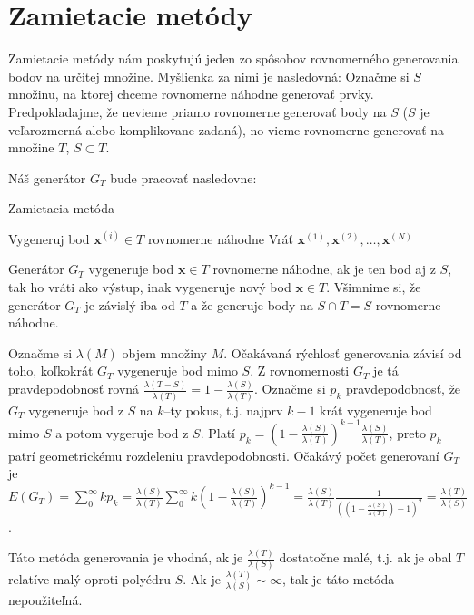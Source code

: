 \section{Zamietacie metódy}

Zamietacie metódy nám poskytujú jeden zo spôsobov rovnomerného generovania bodov na určitej množine.
Myšlienka za nimi je nasledovná: Označme si $S$ množinu, na ktorej chceme rovnomerne náhodne generovať prvky. Predpokladajme, že nevieme priamo rovnomerne generovať body na $S$ ($S$ je veľarozmerná alebo komplikovane zadaná), no vieme rovnomerne generovať na množine $T$, $S \subset T$.

Náš generátor $G_T$ bude pracovať nasledovne:

\begin{algorithm}[H]
	\caption{Zamietacia metóda}
	\label{zamietanie:basic}
	\begin{algorithmic}[1]
			\Repeat Vygeneruj bod $\mathbf x^{(i)} \in T$ rovnomerne náhodne
		\EndFor
		\State Vráť ${\mathbf x^{(1)},\mathbf x^{(2)},\dots,\mathbf x^{(N)}}$
	\end{algorithmic}
\end{algorithm}
Generátor $G_T$ vygeneruje bod $\mathbf x \in T$ rovnomerne náhodne, ak je ten bod aj z $S$, tak ho vráti ako výstup, inak vygeneruje nový bod $\mathbf x \in T$. Všimnime si, že generátor $G_T$ je závislý iba od $T$ a že generuje body na $S \cap T=S$ rovnomerne náhodne.

Označme si $\lambda(M)$ objem množiny $M$. Očakávaná rýchlosť generovania závisí od toho, koľkokrát $G_T$ vygeneruje bod mimo $S$. Z rovnomernosti $G_T$ je tá pravdepodobnosť rovná $\frac{\lambda(T-S)}{\lambda(T)} = 1-\frac{\lambda(S)}{\lambda(T)}$. Označme si $p_k$ pravdepodobnosť, že $G_T$ vygeneruje bod z $S$ na $k$--ty pokus, t.j. najprv $k-1$ krát vygeneruje bod mimo $S$ a potom vygeruje bod z $S$. Platí $p_k= (1-\frac{\lambda(S)}{\lambda(T)})^{k-1}\frac{\lambda(S)}{\lambda(T)}$, preto $p_k$ patrí geometrickému rozdeleniu pravdepodobnosti. Očakávý počet generovaní $G_T$ je $E(G_T)=\sum^{\infty}_{0}kp_k=\frac{\lambda(S)}{\lambda(T)} \sum^{\infty}_{0}k(1-\frac{\lambda(S)}{\lambda(T)})^{k-1}=\frac{\lambda(S)}{\lambda(T)} \frac{1}{((1-\frac{\lambda(S)}{\lambda(T)})-1)^2} = \frac{\lambda(T)}{\lambda(S)}$.

Táto metóda generovania je vhodná, ak je $\frac{\lambda(T)}{\lambda(S)}$ dostatočne malé, t.j. ak je obal $T$ relatíve malý oproti polyédru $S$. Ak je $\frac{\lambda(T)}{\lambda(S)} \sim \infty$, tak je táto metóda nepoužiteľná.

